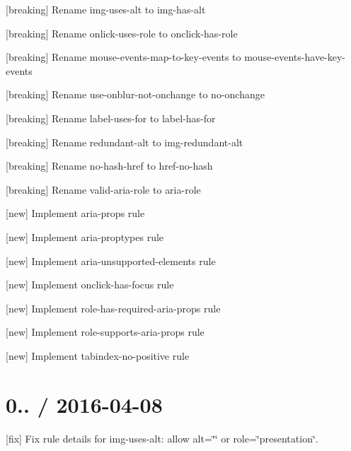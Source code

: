 \begin{DoxyItemize}
\item \mbox{[}breaking\mbox{]} Rename {\ttfamily img-\/uses-\/alt} to {\ttfamily img-\/has-\/alt}
\item \mbox{[}breaking\mbox{]} Rename {\ttfamily onlick-\/uses-\/role} to {\ttfamily onclick-\/has-\/role}
\item \mbox{[}breaking\mbox{]} Rename {\ttfamily mouse-\/events-\/map-\/to-\/key-\/events} to {\ttfamily mouse-\/events-\/have-\/key-\/events}
\item \mbox{[}breaking\mbox{]} Rename {\ttfamily use-\/onblur-\/not-\/onchange} to {\ttfamily no-\/onchange}
\item \mbox{[}breaking\mbox{]} Rename {\ttfamily label-\/uses-\/for} to {\ttfamily label-\/has-\/for}
\item \mbox{[}breaking\mbox{]} Rename {\ttfamily redundant-\/alt} to {\ttfamily img-\/redundant-\/alt}
\item \mbox{[}breaking\mbox{]} Rename {\ttfamily no-\/hash-\/href} to {\ttfamily href-\/no-\/hash}
\item \mbox{[}breaking\mbox{]} Rename {\ttfamily valid-\/aria-\/role} to {\ttfamily aria-\/role}
\item \mbox{[}new\mbox{]} Implement {\ttfamily aria-\/props} rule
\item \mbox{[}new\mbox{]} Implement {\ttfamily aria-\/proptypes} rule
\item \mbox{[}new\mbox{]} Implement {\ttfamily aria-\/unsupported-\/elements} rule
\item \mbox{[}new\mbox{]} Implement {\ttfamily onclick-\/has-\/focus} rule
\item \mbox{[}new\mbox{]} Implement {\ttfamily role-\/has-\/required-\/aria-\/props} rule
\item \mbox{[}new\mbox{]} Implement {\ttfamily role-\/supports-\/aria-\/props} rule
\item \mbox{[}new\mbox{]} Implement {\ttfamily tabindex-\/no-\/positive} rule
\end{DoxyItemize}

\section*{0.. / 2016-\/04-\/08 }


\begin{DoxyItemize}
\item \mbox{[}fix\mbox{]} Fix rule details for img-\/uses-\/alt\+: allow alt=\char`\"{}\char`\"{} or role=\char`\"{}presentation\char`\"{}.
\end{DoxyItemize}

